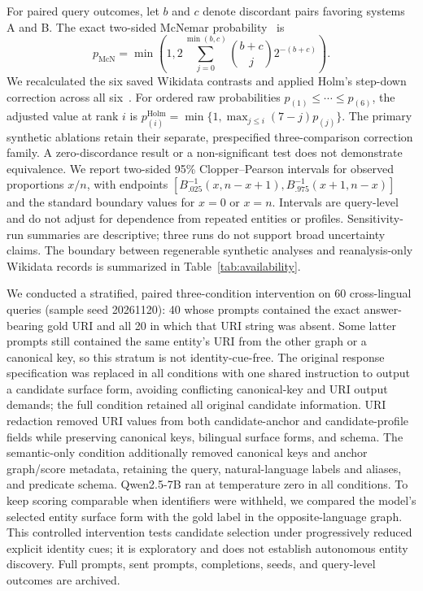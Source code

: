 \documentclass[a4paper,fleqn]{cas-dc}
\begin{document}
For paired query outcomes, let $b$ and $c$ denote discordant pairs favoring systems A and B. The exact two-sided McNemar probability~\cite{mcnemar1947} is
\begin{equation}
p_{\mathrm{McN}}=\min\!\left(1,2\sum_{j=0}^{\min(b,c)}{b+c\choose j}2^{-(b+c)}\right).
\label{eq:mcnemar}
\end{equation}
We recalculated the six saved Wikidata contrasts and applied Holm's step-down correction across all six~\cite{holm1979}. For ordered raw probabilities $p_{(1)}\le\cdots\le p_{(6)}$, the adjusted value at rank $i$ is $p^{\mathrm{Holm}}_{(i)}=\min\{1,\max_{j\le i}(7-j)p_{(j)}\}$. The primary synthetic ablations retain their separate, prespecified three-comparison correction family. A zero-discordance result or a non-significant test does not demonstrate equivalence. We report two-sided 95\% Clopper--Pearson intervals for observed proportions $x/n$, with endpoints $[B^{-1}_{.025}(x,n-x+1),B^{-1}_{.975}(x+1,n-x)]$ and the standard boundary values for $x=0$ or $x=n$. Intervals are query-level and do not adjust for dependence from repeated entities or profiles. Sensitivity-run summaries are descriptive; three runs do not support broad uncertainty claims. The boundary between regenerable synthetic analyses and reanalysis-only Wikidata records is summarized in Table~\ref{tab:availability}.

We conducted a stratified, paired three-condition intervention on 60 cross-lingual queries (sample seed 20261120): 40 whose prompts contained the exact answer-bearing gold URI and all 20 in which that URI string was absent. Some latter prompts still contained the same entity's URI from the other graph or a canonical key, so this stratum is not identity-cue-free. The original response specification was replaced in all conditions with one shared instruction to output a candidate surface form, avoiding conflicting canonical-key and URI output demands; the full condition retained all original candidate information. URI redaction removed URI values from both candidate-anchor and candidate-profile fields while preserving canonical keys, bilingual surface forms, and schema. The semantic-only condition additionally removed canonical keys and anchor graph/score metadata, retaining the query, natural-language labels and aliases, and predicate schema. Qwen2.5-7B ran at temperature zero in all conditions. To keep scoring comparable when identifiers were withheld, we compared the model's selected entity surface form with the gold label in the opposite-language graph. This controlled intervention tests candidate selection under progressively reduced explicit identity cues; it is exploratory and does not establish autonomous entity discovery. Full prompts, sent prompts, completions, seeds, and query-level outcomes are archived.
\end{document}
